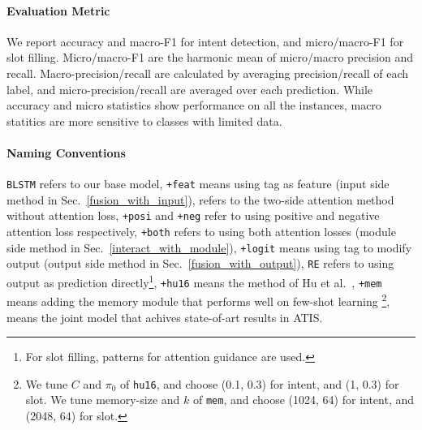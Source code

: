 \paragraph{Evaluation Metric}
We report accuracy and macro-F1 for intent detection, and micro/macro-F1 for slot filling.
Micro/macro-F1 are the harmonic mean of micro/macro precision and recall.
Macro-precision/recall are calculated by averaging precision/recall of each label, and micro-precision/recall are averaged over each prediction.
While accuracy and micro statistics show performance on all the instances, macro statitics are more sensitive to classes with limited data.

\paragraph{Naming Conventions}
\texttt{BLSTM} refers to our base model,
\texttt{+feat} means using \RE tag as feature (input side method in Sec.~\ref{fusion_with_input}),
\ptatt refers to the two-side attention method without attention loss,
\texttt{+posi} and \texttt{+neg} refer to using positive and negative attention loss respectively, \texttt{+both} refers to using both attention losses (\NN module side method in Sec.~\ref{interact_with_module}),
\texttt{+logit} means using \RE tag to modify \NN output (output side method in Sec.~\ref{fusion_with_output}),
\texttt{RE} refers to using \RE output as prediction directly\footnote{
For slot filling, patterns for attention guidance are used.},
\texttt{+hu16} means the method of Hu et al.~,
\texttt{+mem} means adding the memory module that performs well on few-shot learning \cite{kaiser2017learning}\footnote{
We tune $C$ and $\pi_0$ of \texttt{hu16}, and choose (0.1, 0.3) for intent, and (1, 0.3) for slot. We tune memory-size and $k$ of \texttt{mem}, and choose (1024, 64) for intent, and (2048, 64) for slot.
},
\LL means the joint model \cite{liu2016attention} that achives state-of-art results in ATIS.
